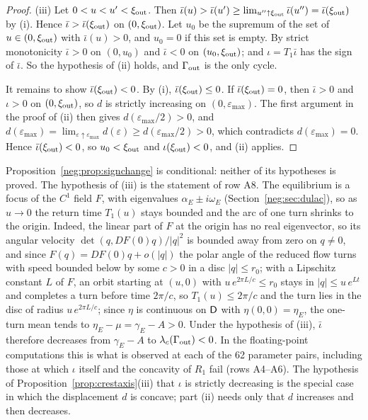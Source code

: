 \begin{proof}
(iii) Let $0<u<u'<\xi_{\rm out}$. Then $\bar\iota(u)>\bar\iota(u')\ge\lim_{u''\uparrow\xi_{\rm out}}\bar\iota(u'')=\bar\iota(\xi_{\rm out})$ by (i). Hence $\bar\iota>\bar\iota(\xi_{\rm out})$ on $(0,\xi_{\rm out})$. Let $u_0$ be the supremum of the set of $u\in(0,\xi_{\rm out})$ with $\bar\iota(u)>0$, and $u_0=0$ if this set is empty. By strict monotonicity $\bar\iota>0$ on $(0,u_0)$ and $\bar\iota<0$ on $(u_0,\xi_{\rm out})$; and $\iota=T_1\bar\iota$ has the sign of $\bar\iota$. So the hypothesis of (ii) holds, and $\Gamma_{\rm out}$ is the only cycle.

It remains to show $\bar\iota(\xi_{\rm out})<0$. By (i), $\bar\iota(\xi_{\rm out})\le0$. If $\bar\iota(\xi_{\rm out})=0$, then $\bar\iota>0$ and $\iota>0$ on $(0,\xi_{\rm out})$, so $d$ is strictly increasing on $(0,\varepsilon_{\max})$. The first argument in the proof of (ii) then gives $d(\varepsilon_{\max}/2)>0$, and $d(\varepsilon_{\max})=\lim_{\varepsilon\uparrow\varepsilon_{\max}}d(\varepsilon)\ge d(\varepsilon_{\max}/2)>0$, which contradicts $d(\varepsilon_{\max})=0$. Hence $\bar\iota(\xi_{\rm out})<0$, so $u_0<\xi_{\rm out}$ and $\iota(\xi_{\rm out})<0$, and (ii) applies.
\end{proof}
Proposition~\ref{neg:prop:signchange} is conditional: neither of its hypotheses is proved. The hypothesis of (iii) is the statement of row A8. The equilibrium is a focus of the $C^1$ field $F$, with eigenvalues $\alpha_E\pm i\omega_E$ (Section~\ref{neg:sec:dulac}), so as $u\to0$ the return time $T_1(u)$ stays bounded and the arc of one turn shrinks to the origin. Indeed, the linear part of $F$ at the origin has no real eigenvector, so its angular velocity $\det(q,DF(0)q)/|q|^2$ is bounded away from zero on $q\ne0$, and since $F(q)=DF(0)q+o(|q|)$ the polar angle of the reduced flow turns with speed bounded below by some $c>0$ in a disc $|q|\le r_0$; with a Lipschitz constant $L$ of $F$, an orbit starting at $(u,0)$ with $u\,e^{2\pi L/c}\le r_0$ stays in $|q|\le u\,e^{Lt}$ and completes a turn before time $2\pi/c$, so $T_1(u)\le2\pi/c$ and the turn lies in the disc of radius $u\,e^{2\pi L/c}$; since $\eta$ is continuous on $\mathsf D$ with $\eta(0,0)=\eta_E$, the one-turn mean tends to $\eta_E-\mu=\gamma_E-A>0$. Under the hypothesis of (iii), $\bar\iota$ therefore decreases from $\gamma_E-A$ to $\lambda_c(\Gamma_{\rm out})<0$. In the floating-point computations this is what is observed at each of the 62 parameter pairs, including those at which $\iota$ itself and the concavity of $R_1$ fail (rows A4--A6). The hypothesis of Proposition~\ref{prop:crestaxis}(iii) that $\iota$ is strictly decreasing is the special case in which the displacement $d$ is concave; part (ii) needs only that $d$ increases and then decreases.

